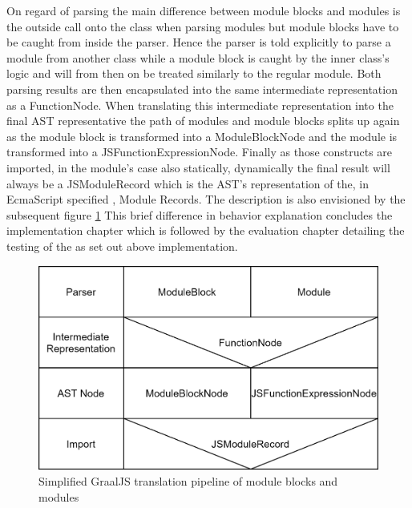 On regard of parsing the main difference between module blocks and modules is the outside call onto the class when parsing modules but module blocks have to be caught from inside the parser. Hence the parser is told explicitly to parse a module from another class while a module block is caught by the inner class's logic and will from then on be treated similarly to the regular module. Both parsing results are then encapsulated into the same intermediate representation as a FunctionNode. When translating this intermediate representation into the final AST representative the path of modules and module blocks splits up again as the module block is transformed into a ModuleBlockNode and the module is transformed into a JSFunctionExpressionNode. Finally as those constructs are imported, in the module's case also statically, dynamically the final result will always be a JSModuleRecord which is the AST's representation of the, in EcmaScript specified \cite{ecma}, Module Records. The description is also envisioned by the subsequent figure \ref{fig:blockVSmodule} This brief difference in behavior explanation concludes the implementation chapter which is followed by the evaluation chapter detailing the testing of the as set out above implementation.

\begin{figure}[h!]
    \includegraphics[scale=0.165]{figures/ModuleBlockVSModule.png}
    \caption{Simplified GraalJS translation pipeline of module blocks and modules}
    \label{fig:blockVSmodule}
\end{figure}